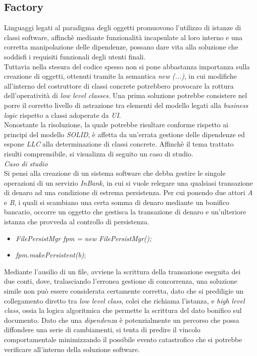 \documentclass{article}
\begin{document}
\subsection*{Factory}
\large
Linguaggi legati al paradigma degli oggetti promuovono l'utilizzo di istanze di classi software, affinchè mediante funzionalità incapsulate al loro interno e una corretta manipolazione delle dipendenze, possano dare vita alla soluzione che soddisfi i requisiti funzionali degli utenti finali.\vspace*{14pt}\\
Tuttavia nella stesura del codice spesso non si pone abbastanza importanza sulla creazione di oggetti, ottenuti tramite la semantica \textit{new (...)}, in cui modifiche all'interno del costruttore di classi concrete potrebbero provocare la rottura dell'operatività di \textit{low level classes}. Una prima soluzione potrebbe consistere nel porre il corretto livello di astrazione tra elementi del modello legati alla \textit{business logic} rispetto a classi adoperate da \textit{UI}.\vspace*{14pt}\\
Nonostante la risoluzione, la quale potrebbe risultare conforme rispetto ai principi del modello \textit{SOLID}, è affetta da un'errata gestione delle dipendenze ed espone \textit{LLC} alla determinazione di classi concrete. Affinchè il tema trattato risulti comprensibile, si visualizza di seguito un caso di studio.\vspace*{14pt}\\
\textit{Caso di studio}\\
Si pensi alla creazione di un sistema software che debba gestire le singole operazioni di un servizio \textit{InBank}, in cui si vuole relegare una qualsiasi transazione di denaro ad una condizione di estrema persistenza. Per cui ponendo due attori \textit{A} e \textit{B}, i quali si scambiano una certa somma di denaro mediante un bonifico bancario, occorre un oggetto che gestisca la transazione di denaro e un'ulteriore istanza che provveda al controllo di persistenza. 
\begin{itemize}[label={ }, leftmargin=1cm]
    \itemsep0em
    \item \textit{FilePersistMgr fpm = new FilePersistMgr();}
    \item \textit{fpm.makePersistent(b)};
\end{itemize} 
Mediante l'ausilio di un file, avviene la scrittura della transazione eseguita dei due conti, dove, tralasciando l'erronea gestione di concorrenza, una soluzione simile non può essere considerata certamente corretta, dato che si prediligie un collegamento diretto tra \textit{low level class}, colei che richiama l'istanza, e \textit{high level class}, ossia la logica algoritmica che permette la scrittura del dato bonifico sul documento. Dato che una \textit{dipendenza} è potenzialmente un percorso che possa diffondere una serie di cambiamenti, si tenta di predire il vincolo comportamentale minimizzando il possibile evento catastrofico che si potrebbe verificare all'interno della soluzione software.\vspace*{14pt}\\
\end{document}
